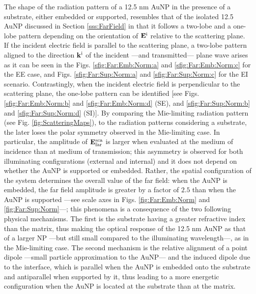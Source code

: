 The shape of the radiation pattern of a 12.5 nm AuNP in the presence of a substrate, either embedded or supported, resembles that of the isolated 12.5 AuNP discussed in Section \ref{sss:FarField} in that it follows a two-lobe and a one-lobe pattern depending on the orientation of $\vb{E}^\text{i}$ relative to the scattering plane. If the incident electric field is parallel to the scattering plane, a two-lobe pattern aligned to the direction $\vb{k}^\text{i}$ of the incident ---and transmitted--- plane wave arises as it can be seen in the Figs. \ref{sfig:Far:Emb:Norm:a} and  \ref{sfig:Far:Emb:Norm:c} for the EE case, and Figs.  \ref{sfig:Far:Sup:Norm:a} and \ref{sfig:Far:Sup:Norm:c} for the EI scenario. Contrastingly, when the incident electric field is perpendicular to the scattering plane, the one-lobe pattern can be identified [see Figs. \ref{sfig:Far:Emb:Norm:b} and \ref{sfig:Far:Emb:Norm:d} (SE), and \ref{sfig:Far:Sup:Norm:b} and \ref{sfig:Far:Sup:Norm:d} (SI)]. By comparing the Mie-limiting radiation pattern (see Fig. \ref{fig:ScatteringMaps}), to the radiation patterns considering a substrate, the later loses the polar symmetry observed in the Mie-limiting case.  In particular, the amplitude of $\vb{E}^\text{sca}_\text{far}$ is larger when evaluated at the medium of incidence  than at medium of transmission; this asymmetry is observed for both illuminating configurations (external and internal) and it does not depend on whether the AuNP is supported or embedded. Rather, the spatial configuration of the system determines the overall value of the far field: when the AuNP is embedded, the far field amplitude is greater by a factor of $2.5$  than when the AuNP is supported ---see scale axes in Figs. \ref{fig:Far:Emb:Norm} and \ref{fig:Far:Sup:Norm}---; this phenomena  is a consequence of the two following physical mechanisms. The first is the substrate having a greater refractive index than the matrix, thus making the optical response of the 12.5 nm AuNP as that of a larger NP ---but still small compared to the illuminating wavelength---, as in the Mie-limiting case. The second mechanism is the relative alignment of a point dipole ---small particle approximation to the AuNP--- and the induced dipole due to the interface, which is parallel when the AuNP is embedded onto the substrate and antiparallel when supported by it, thus leading to a more energetic configuration when the AuNP is located at the substrate than at the matrix.

